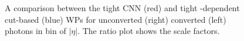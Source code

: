 \begin{figure}[htbp]
    \centering
	\begin{tcolorbox}[colback=black!5!white,colframe=white!75!black]
    \caption{A comparison between the tight CNN (red) and tight \eT-dependent cut-based (blue) WPs for unconverted (right) converted (left) photons in bin of $|\eta|$. The ratio plot shows the scale factors.}
    \label{Eff:Tight:Dep}
    \end{tcolorbox}
    
\end{figure}
